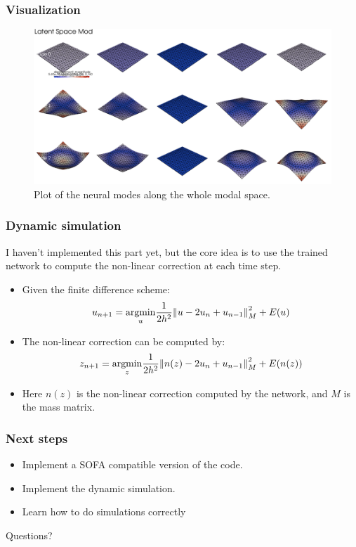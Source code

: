 \documentclass{beamer}
\DeclareMathOperator{\argmin}{argmin}
\begin{document}
\begin{frame}
    \frametitle{Visualization}
    \begin{figure}
        \centering
        \includegraphics[width=\textwidth]{Images/modes.png}
        \caption{Plot of the neural modes along the whole modal space.}
        \label{fig:modes}
    \end{figure}
\end{frame}



\begin{frame}
    \frametitle{Dynamic simulation}
    I haven't implemented this part yet, but the core idea is to use the trained network to compute the non-linear correction at each time step.
    \begin{itemize}
        \item Given the finite difference scheme:
        \[
          u_{n+1} = \underset{u}{\argmin}  \frac{1}{2h^2} \norm{u - 2u_n + u_{n-1}}^2_M + E(u)
        \]
        \item The non-linear correction can be computed by:
        \[
        z_{n+1} = \underset{z}{\argmin}  \frac{1}{2h^2} \norm{n(z) - 2u_n + u_{n-1}}^2_M + E(n(z))
        \]
        \item Here \(n(z)\) is the non-linear correction computed by the network, and \(M\) is the mass matrix.
    \end{itemize}
\end{frame}

\begin{frame}
    \frametitle{Next steps}
    \begin{itemize}
        \item Implement a SOFA compatible version of the code.
        \item Implement the dynamic simulation.
        \item Learn how to do simulations correctly
    
    \end{itemize}
\end{frame}

\begin{frame}
    \begin{center}
        \Huge{Questions?}
    \end{center}

\end{frame}
\end{document}
